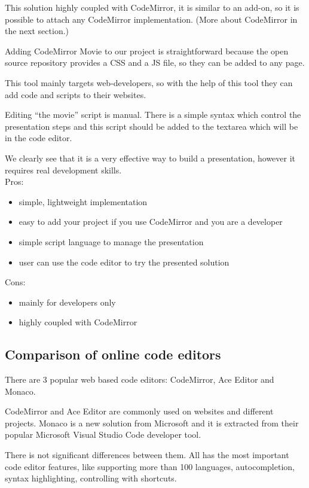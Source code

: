 This solution highly coupled with CodeMirror, it is similar to an
add-on, so it is possible to attach any CodeMirror implementation. (More
about CodeMirror in the next section.)

Adding CodeMirror Movie to our project is straightforward because the
open source repository provides a CSS and a JS file, so they can be
added to any page.

This tool mainly targets web-developers, so with the help of this tool
they can add code and scripts to their websites.

Editing ``the movie'' script is manual. There is a simple syntax which
control the presentation steps and this script should be added to the
textarea which will be in the code editor.

We clearly see that it is a very effective way to build a presentation,
however it requires real development skills.\\
Pros:

\begin{itemize}
\item
  simple, lightweight implementation
\item
  easy to add your project if you use CodeMirror and you are a developer
\item
  simple script language to manage the presentation
\item
  user can use the code editor to try the presented solution
\end{itemize}

Cons:

\begin{itemize}
\item
  mainly for developers only
\item
  highly coupled with CodeMirror
\end{itemize}

\subsection{Comparison of online code
editors}\label{comparison-of-online-code-editors}

There are 3 popular web based code editors: CodeMirror, Ace Editor and
Monaco.

CodeMirror and Ace Editor are commonly used on websites and different
projects. Monaco is a new solution from Microsoft and it is extracted
from their popular Microsoft Visual Studio Code developer tool.

There is not significant differences between them. All has the most
important code editor features, like supporting more than 100 languages,
autocompletion, syntax highlighting, controlling with shortcuts.

